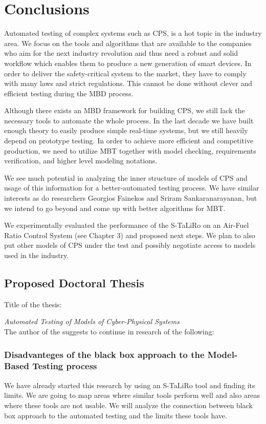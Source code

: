 \chapter{Conclusions}
% 

Automated testing of complex systems such as CPS, is a hot topic in the industry area. We focus on the tools and algorithms that are available to the companies who aim for the next industry revolution and thus need a robust and solid workflow which enables them to produce a new generation of smart devices. In order to deliver the safety-critical system to the market, they have to comply with many laws and strict regulations. This cannot be done without clever and efficient testing during the MBD process.

Although there exists an MBD framework for building CPS, we still lack the necessary tools to automate the whole process. In the last decade we have built enough theory to easily produce simple real-time systems, but we still heavily depend on prototype testing. In order to achieve more efficient and competitive production, we need to utilize MBT together with model checking, requirements verification, and higher level modeling notations.

We see much potential in analyzing the inner structure of models of CPS and usage of this information for a better-automated testing process. We have similar interests as do researchers Georgios Fainekos and Sriram Sankaranarayanan, but we intend to go beyond and come up with better algorithms for MBT.

We experimentally evaluated the performance of the S-TaLiRo on an Air-Fuel Ratio Control System  (see Chapter 3) and proposed next steps. We plan to also put other models of CPS under the test and possibly negotiate access to models used in the industry.

\section{Proposed Doctoral Thesis}
Title of the thesis:

\textit{Automated Testing of Models of Cyber-Physical Systems}
\\
The author of the \thesis{} suggests to continue in research of the following:
\subsection{Disadvanteges of the black box approach to the Model-Based Testing process}
We have already started this research by using an S-TaLiRo tool and finding its limits. We are going to map areas where similar tools perform well and also areas where these tools are not usable. We will analyze the connection between black box approach to the automated testing and the limits these tools have.

